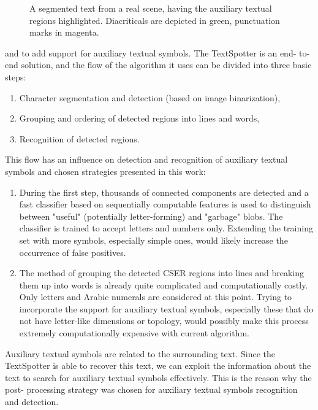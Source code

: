 \documentclass[12pt,a4paper]{report}
\begin{document}
\begin{figure}[htbp]
    \centering
    \caption{A segmented text from a real scene, having the auxiliary textual regions highlighted. Diacriticals are depicted in green, punctuation marks in magenta.}
    \label{fig:auxiliary}
\end{figure}

and to add support for auxiliary textual symbols. The TextSpotter is an end- to- end solution, and the flow of the algorithm it uses can be divided into three basic steps:
\begin{enumerate}
    \item Character segmentation and detection (based on image binarization),
    \item Grouping and ordering of detected regions into lines and words,
    \item Recognition of detected regions.
\end{enumerate}

This flow has an influence on detection and recognition of auxiliary textual symbols and chosen strategies presented in this work:
\begin{enumerate}
    \item During the first step, thousands of connected components are detected and a fast classifier based on sequentially computable features is used to distinguish between "useful" (potentially letter-forming) and "garbage" blobs. The classifier is trained to accept letters and numbers only. Extending the training set with more symbols, especially simple ones, would likely increase the occurrence of false positives.
    \item The method of grouping the detected CSER regions into lines and breaking them up into words is already quite complicated and computationally costly. Only letters and Arabic numerals are considered at this point. Trying to incorporate the support for auxiliary textual symbols, especially these that do not have letter-like dimensions or topology, would possibly make this process extremely computationally expensive with current algorithm.
\end{enumerate}

Auxiliary textual symbols are related to the surrounding text. Since the TextSpotter is able to recover this text, we can exploit the information about the text to search for auxiliary textual symbols effectively. This is the reason why the post- processing strategy was chosen for auxiliary textual symbols recognition and detection.
\end{document}
